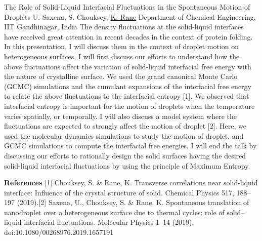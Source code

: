
    \begin{abstract_online}{The Role of Solid-Liquid Interfacial Fluctuations in the Spontaneous Motion of Droplets}{%
        U. Saxena, S. Chouksey, \underline{K. Rane}}{%
        \IStag}{%
        Department of Chemical Engineering, IIT Gandhinagar, India}
    The density fluctuations at the solid-liquid interfaces have received great attention in recent decades in the context of protein folding. In this presentation, I will discuss them in the context of droplet motion on heterogeneous surfaces. I will first discuss our efforts to understand how the above fluctuations affect the variation of solid-liquid interfacial free energy with the nature of crystalline surface. We used the grand canonical Monte Carlo (GCMC) simulations and the cumulant expansions of the interfacial free energy to relate the above fluctuations to the interfacial entropy [1]. We observed that interfacial entropy is important for the motion of droplets when the temperature varies spatially, or temporally. I will also discuss a model system where the fluctuations are expected to strongly affect the motion of droplet [2]. Here, we used the molecular dynamics simulations to study the motion of droplet, and GCMC simulations to compute the interfacial free energies. I will end the talk by discussing our efforts to rationally design the solid surfaces having the desired solid-liquid interfacial fluctuations by using the principle of Maximum Entropy. 
    
        \textbf{References} \newline{}[1] Chouksey, S. & Rane, K. Transverse correlations near solid-liquid interface: Influence of the crystal structure of solid. Chemical Physics 517, 188–197 (2019).\newline{}[2] Saxena, U., Chouksey, S. & Rane, K. Spontaneous translation of nanodroplet over a heterogeneous surface due to thermal cycles: role of solid–liquid interfacial fluctuations. Molecular Physics 1–14 (2019). doi:10.1080/00268976.2019.1657191
    \end{abstract_online}
    